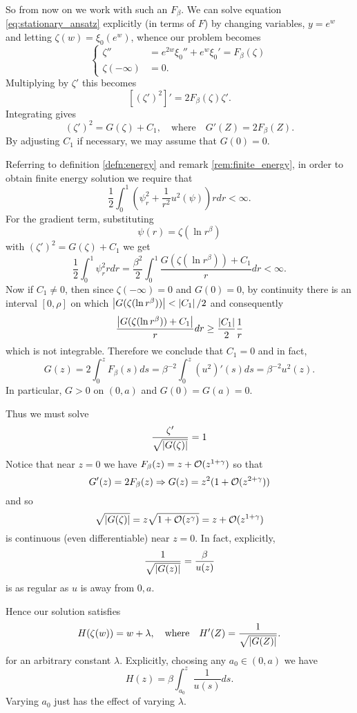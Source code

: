\documentclass{amsart}
\begin{document}
So from now on we work with such an \(F_{\beta}\). We can solve equation \eqref{eq:stationary_ansatz} explicitly (in terms of \(F\)) by changing variables, \(y = e^w\) and letting \(\zeta(w) = \xi_0(e^w)\), whence our problem becomes
\[
\begin{cases}
\zeta'' &= e^{2w} \xi_0'' + e^w \xi_0' = F_{\beta} (\zeta) \\
\zeta(-\infty) &= 0.
\end{cases}
\]
Multiplying by \(\zeta'\) this becomes
\[
[(\zeta')^2]' = 2 F_{\beta} (\zeta) \zeta'.
\]
Integrating gives
\[
(\zeta')^2 = G(\zeta) + C_1, \quad \text{where} \quad G'(Z) = 2 F_{\beta}(Z).
\]
By adjusting \(C_1\) if necessary, we may assume that \(G(0) = 0\).

Referring to definition \ref{defn:energy} and remark \ref{rem:finite_energy}, in order to obtain finite energy solution we require that
\[
\frac{1}{2} \int_0^1 \left(\psi_r^2 + \frac{1}{r^2} u^2(\psi)\right) r dr < \infty.
\]
For the gradient term, substituting
\[
\psi(r) = \zeta(\ln r^{\beta})
\]
with \((\zeta')^2 = G(\zeta) + C_1\) we get
\[
\frac{1}{2} \int_0^1 \psi_r^2 r dr  = \frac{\beta^2}{2} \int_0^1 \frac{G(\zeta(\ln r^{\beta})) + C_1}{r} dr < \infty.
\]
Now if \(C_1 \ne 0\), then since \(\zeta(-\infty) = 0\) and \(G(0) = 0\), by continuity there is an interval \([0, \rho]\) on which \(\left|{G(\zeta(\ln r^{\beta}))}\right| < \left|{C_1}\right|/2\) and consequently
\[
\frac{\left|{G(\zeta(\ln r^{\beta})) + C_1}\right|}{r} dr \geq \frac{\left|{C_1}\right|}{2} \frac{1}{r}
\]
which is not integrable. Therefore we conclude that \(C_1 = 0\) and in fact,
\begin{equation}
\label{eq:G}
G(z) = 2 \int_0^z F_{\beta} (s) ds = \beta^{-2} \int_0^z (u^2)' (s) ds = \beta^{-2} u^2 (z).
\end{equation}
In particular, \(G > 0\) on \((0,a)\) and \(G(0) = G(a) = 0\).

Thus we must solve
\[
\frac{\zeta'}{\sqrt{\left|{G(\zeta)}\right|}} = 1
\]
Notice that near \(z = 0\) we have \(F_{\beta} (z) = z + \operatorname{\mathcal{O}}(z^{1+\gamma})\) so that
\[
G'(z) = 2F_{\beta}(z) \Rightarrow G(z) = z^2(1 + \operatorname{\mathcal{O}}(z^{2 + \gamma}))
\]
and so
\[
\sqrt{\left|{G(\zeta)}\right|} = z \sqrt{1 + \operatorname{\mathcal{O}}(z^{\gamma})} = z + \operatorname{\mathcal{O}}(z^{1 + \gamma})
\]
is continuous (even differentiable) near \(z = 0\). In fact, explicitly,
\[
\frac{1}{\sqrt{\left|{G(z)}\right|}} = \frac{\beta}{u(z)}
\]
is as regular as \(u\) is away from \(0, a\).

Hence our solution satisfies
\[
H (\zeta(w)) = w + \lambda, \quad \text{where} \quad H'(Z) = \frac{1}{\sqrt{\left|{G(Z)}\right|}}.
\]
for an arbitrary constant \(\lambda\). Explicitly, choosing any \(a_0 \in (0, a)\) we have
\begin{equation}
\label{eq:H}
H(z) = \beta \int_{a_0}^z \frac{1}{u(s)} ds.
\end{equation}
Varying \(a_0\) just has the effect of varying \(\lambda\).
\end{document}
